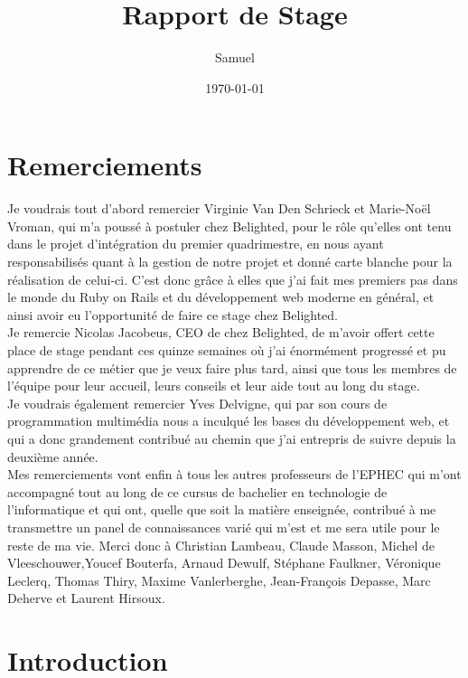 \documentclass{report}
\title{Rapport de Stage}
\author{Samuel \bsc{Monroe}}
\date{\today}
\begin{document}
\maketitle

\newpage
\thispagestyle{empty}
\mbox{}

\tableofcontents

\chapter*{Remerciements}

  Je voudrais tout d'abord remercier Virginie Van Den Schrieck et Marie-Noël Vroman, qui m'a poussé à postuler chez Belighted, pour
  le rôle qu'elles ont tenu dans le projet d'intégration du premier quadrimestre,
  en nous ayant responsabilisés quant à la gestion de notre projet et donné carte
  blanche pour la réalisation de celui-ci.
  C'est donc grâce à elles que j'ai fait mes premiers pas dans le monde du Ruby on Rails
  et du développement web moderne en général, et ainsi avoir eu l'opportunité de faire ce stage chez Belighted.\\

  Je remercie Nicolas Jacobeus, CEO de chez Belighted, de m'avoir offert cette place de stage pendant ces quinze
  semaines où j'ai énormément progressé et pu apprendre de ce métier que je veux faire plus tard, ainsi que tous les membres
  de l'équipe pour leur accueil, leurs conseils et leur aide tout au long du stage.\\

  Je voudrais également remercier Yves Delvigne, qui par son cours de programmation multimédia
  nous a inculqué les bases du développement web, et qui a donc grandement contribué
  au chemin que j'ai entrepris de suivre depuis la deuxième année.\\

  Mes remerciements vont enfin à tous les autres professeurs de l'EPHEC qui m'ont accompagné tout au long
  de ce cursus de bachelier en technologie de l'informatique et qui ont, quelle que soit la matière
  enseignée, contribué à me transmettre un panel de connaissances varié qui m'est et me sera utile pour
  le reste de ma vie. Merci donc à Christian Lambeau, Claude Masson, Michel de Vleeschouwer,Youcef Bouterfa, Arnaud Dewulf,
  Stéphane Faulkner, Véronique Leclerq, Thomas Thiry, Maxime Vanlerberghe, Jean-François Depasse, Marc Deherve et Laurent Hirsoux.\\

\chapter{Introduction}
\end{document}
